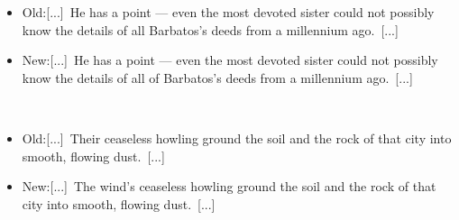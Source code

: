 \documentclass[a4paper,12pt]{article}
\begin{document}
\begin{itemize}
\item Old:[...] He has a point — even the most devoted sister could not possibly know the details of all Barbatos's deeds from a millennium ago. [...]
\item New:[...] He has a point — even the most devoted sister could not possibly know the details of all of Barbatos's deeds from a millennium ago. [...]
\end{itemize}\\ \par \vspace{0.5cm}

\begin{itemize}
\item Old:[...] Their ceaseless howling ground the soil and the rock of that city into smooth, flowing dust. [...]
\item New:[...] The wind's ceaseless howling ground the soil and the rock of that city into smooth, flowing dust. [...]
\end{itemize}\\ \par \vspace{0.5cm}
\end{document}
